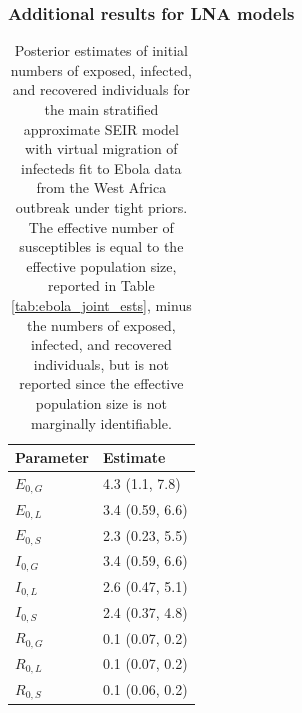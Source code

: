 \subsubsection{Additional results for LNA models}
\label{subsubsec:ebola_joint_supp_res}

\begin{table}[htbp]
	\caption[Posterior estimates of initial numbers of exposed, infected, and recovered individuals for a stratified SEIR model fit to Ebola outbreak data.]{Posterior estimates of initial numbers of exposed, infected, and recovered individuals for the main stratified approximate SEIR model with virtual migration of infecteds fit to Ebola data from the West Africa outbreak under tight priors. The effective number of susceptibles is equal to the effective population size, reported in Table \ref{tab:ebola_joint_ests}, minus the numbers of exposed, infected, and recovered individuals, but is not reported since the effective population size is not marginally identifiable.}
	\label{tab:ebola_joint_initdist_res}
	\centering
	\begin{tabular}{ll}
		\hline
		\textbf{Parameter} & \textbf{Estimate }\\ 
		\hline
		$ E_{0,G} $&  4.3 (1.1, 7.8) \\ 
		$ E_{0,L} $&  3.4 (0.59, 6.6) \\ 
		$ E_{0,S} $&  2.3 (0.23, 5.5) \\ 
		$ I_{0,G} $& 3.4 (0.59, 6.6) \\ 
		$ I_{0,L} $&  2.6 (0.47, 5.1) \\ 
		$ I_{0,S} $& 2.4 (0.37, 4.8) \\ 
		$ R_{0,G} $& 0.1 (0.07, 0.2) \\ 
		$ R_{0,L} $&  0.1 (0.07, 0.2) \\ 
		$ R_{0,S} $&  0.1 (0.06, 0.2) \\ 
		\hline
	\end{tabular}
\end{table}

